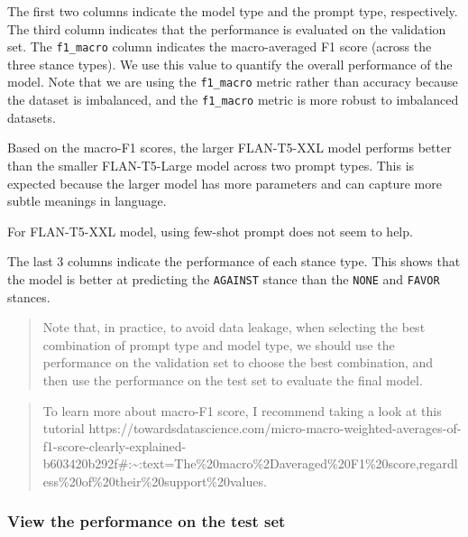\documentclass[11pt]{article}
\begin{document}
    The first two columns indicate the model type and the prompt type,
respectively. The third column indicates that the performance is
evaluated on the validation set. The \texttt{f1\_macro} column indicates
the macro-averaged F1 score (across the three stance types). We use this
value to quantify the overall performance of the model. Note that we are
using the \texttt{f1\_macro} metric rather than accuracy because the
dataset is imbalanced, and the \texttt{f1\_macro} metric is more robust
to imbalanced datasets.

Based on the macro-F1 scores, the larger FLAN-T5-XXL model performs
better than the smaller FLAN-T5-Large model across two prompt types.
This is expected because the larger model has more parameters and can
capture more subtle meanings in language.

For FLAN-T5-XXL model, using few-shot prompt does not seem to help.

The last 3 columns indicate the performance of each stance type. This
shows that the model is better at predicting the \texttt{AGAINST} stance
than the \texttt{NONE} and \texttt{FAVOR} stances.

\begin{quote}
Note that, in practice, to avoid data leakage, when selecting the best
combination of prompt type and model type, we should use the performance
on the validation set to choose the best combination, and then use the
performance on the test set to evaluate the final model.
\end{quote}

    \begin{quote}
To learn more about macro-F1 score, I recommend taking a look at this
tutorial
https://towardsdatascience.com/micro-macro-weighted-averages-of-f1-score-clearly-explained-b603420b292f\#:\textasciitilde:text=The\%20macro\%2Daveraged\%20F1\%20score,regardless\%20of\%20their\%20support\%20values.
\end{quote}

    \hypertarget{view-the-performance-on-the-test-set}{%
\subsubsection{View the performance on the test
set}\label{view-the-performance-on-the-test-set}}
\end{document}
